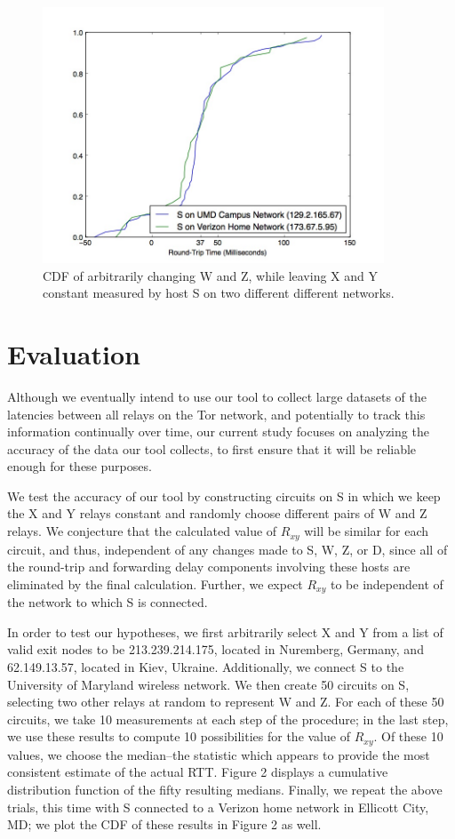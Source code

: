 \documentclass[twocolumn,11pt]{article}
\begin{document}
\newpage

\begin{figure}[t!]
\centering
\includegraphics[width=4in]{cdf}
\caption{\label{fig:myfigure} CDF of arbitrarily changing W and Z, while leaving X and Y constant measured by host S on two different different networks.}
\end{figure}

\section{Evaluation}

Although we eventually intend to use our tool to collect large datasets of the latencies between all relays on the Tor network, and potentially to track this information continually over time, our current study focuses on analyzing the accuracy of the data our tool collects, to first ensure that it will be reliable enough for these purposes.

We test the accuracy of our tool by constructing circuits on S in which we keep the X and Y relays constant and randomly choose different pairs of W and Z relays. We conjecture that the calculated value of $R_{xy}$ will be similar for each circuit, and thus, independent of any changes made to S, W, Z, or D, since all of the round-trip and forwarding delay components involving these hosts are eliminated by the final calculation. Further, we expect $R_{xy}$ to be independent of the network to which S is connected.

In order to test our hypotheses, we first arbitrarily select X and Y from a list of valid exit nodes to be 213.239.214.175, located in Nuremberg, Germany, and 62.149.13.57, located in Kiev, Ukraine. Additionally, we connect S to the University of Maryland wireless network. We then create 50 circuits on S, selecting two other relays at random to represent W and Z. For each of these 50 circuits, we take 10 measurements at each step of the procedure; in the last step, we use these results to compute 10 possibilities for the value of $R_{xy}$. Of these 10 values, we choose the median--the statistic which appears to provide the most consistent estimate of the actual RTT. Figure 2 displays a cumulative distribution function of the fifty resulting medians. Finally, we repeat the above trials, this time with S connected to a Verizon home network in Ellicott City, MD; we plot the CDF of these results in Figure 2 as well.
\end{document}
